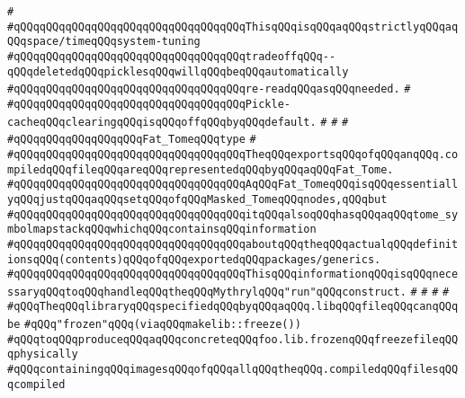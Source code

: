 \verb|#|\newline
\verb|#qQQqqQQqqQQqqQQqqQQqqQQqqQQqqQQqqQQqThisqQQqisqQQqaqQQqstrictlyqQQqaqQQqspace/timeqQQqsystem-tuning|\newline
\verb|#qQQqqQQqqQQqqQQqqQQqqQQqqQQqqQQqqQQqtradeoffqQQq--qQQqdeletedqQQqpicklesqQQqwillqQQqbeqQQqautomatically|\newline
\verb|#qQQqqQQqqQQqqQQqqQQqqQQqqQQqqQQqqQQqre-readqQQqasqQQqneeded.|\newline
\verb|#|\newline
\verb|#qQQqqQQqqQQqqQQqqQQqqQQqqQQqqQQqqQQqPickle-cacheqQQqclearingqQQqisqQQqoffqQQqbyqQQqdefault.|\newline
\verb|#|\newline
\verb|#|\newline
\verb|#|\newline
\verb|#qQQqqQQqqQQqqQQqqQQqFat_TomeqQQqtype|\newline
\verb|#|\newline
\verb|#qQQqqQQqqQQqqQQqqQQqqQQqqQQqqQQqqQQqTheqQQqexportsqQQqofqQQqanqQQq.compiledqQQqfileqQQqareqQQqrepresentedqQQqbyqQQqaqQQqFat_Tome.|\newline
\verb|#qQQqqQQqqQQqqQQqqQQqqQQqqQQqqQQqqQQqAqQQqFat_TomeqQQqisqQQqessentiallyqQQqjustqQQqaqQQqsetqQQqofqQQqMasked_TomeqQQqnodes,qQQqbut|\newline
\verb|#qQQqqQQqqQQqqQQqqQQqqQQqqQQqqQQqqQQqitqQQqalsoqQQqhasqQQqaqQQqtome_symbolmapstackqQQqwhichqQQqcontainsqQQqinformation|\newline
\verb|#qQQqqQQqqQQqqQQqqQQqqQQqqQQqqQQqqQQqaboutqQQqtheqQQqactualqQQqdefinitionsqQQq(contents)qQQqofqQQqexportedqQQqpackages/generics.|\newline
\verb|#qQQqqQQqqQQqqQQqqQQqqQQqqQQqqQQqqQQqThisqQQqinformationqQQqisqQQqnecessaryqQQqtoqQQqhandleqQQqtheqQQqMythrylqQQq"run"qQQqconstruct.|\newline
\verb|#|\newline
\verb|#|\newline
\verb|#|\newline
\verb|#|\newline
\verb|#qQQqTheqQQqlibraryqQQqspecifiedqQQqbyqQQqaqQQq.libqQQqfileqQQqcanqQQqbe|\newline
\verb|#qQQq"frozen"qQQq(viaqQQqmakelib::freeze())|\newline
\verb|#qQQqtoqQQqproduceqQQqaqQQqconcreteqQQqfoo.lib.frozenqQQqfreezefileqQQqphysically|\newline
\verb|#qQQqcontainingqQQqimagesqQQqofqQQqallqQQqtheqQQq.compiledqQQqfilesqQQqcompiled|\newline
